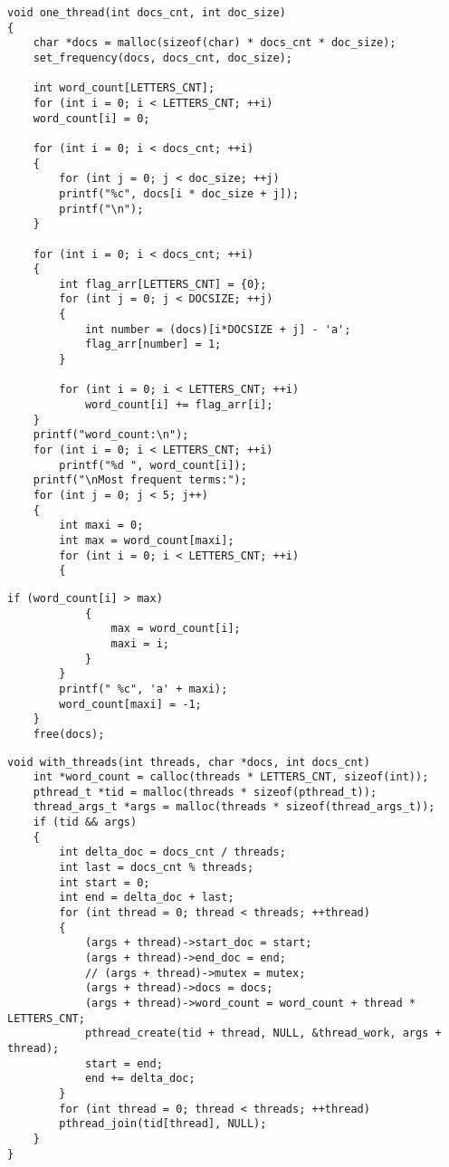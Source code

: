 \clearpage
\begin{center}
	\captionsetup{justification=raggedright,singlelinecheck=off}
	\begin{lstlisting}[label=lst:DF,caption=Однопоточная функция выделения наиболее употребляемых термов]
void one_thread(int docs_cnt, int doc_size)
{
	char *docs = malloc(sizeof(char) * docs_cnt * doc_size);
	set_frequency(docs, docs_cnt, doc_size);
	
	int word_count[LETTERS_CNT];
	for (int i = 0; i < LETTERS_CNT; ++i)
	word_count[i] = 0;
	
	for (int i = 0; i < docs_cnt; ++i)
	{
		for (int j = 0; j < doc_size; ++j)
		printf("%c", docs[i * doc_size + j]);
		printf("\n");
	}
	
	for (int i = 0; i < docs_cnt; ++i)
	{
		int flag_arr[LETTERS_CNT] = {0};
		for (int j = 0; j < DOCSIZE; ++j)
		{
			int number = (docs)[i*DOCSIZE + j] - 'a';
			flag_arr[number] = 1;
		}
			
		for (int i = 0; i < LETTERS_CNT; ++i)
			word_count[i] += flag_arr[i];
	}
	printf("word_count:\n");
	for (int i = 0; i < LETTERS_CNT; ++i)
		printf("%d ", word_count[i]);
	printf("\nMost frequent terms:");
	for (int j = 0; j < 5; j++)
	{
		int maxi = 0;
		int max = word_count[maxi];
		for (int i = 0; i < LETTERS_CNT; ++i)
		{
	\end{lstlisting}
\clearpage
	\begin{lstlisting}[label=lst:DF2,caption=Однопоточная функция выделения наиболее употребляемых термов]
			if (word_count[i] > max)
			{
				max = word_count[i];
				maxi = i;
			}
		}
		printf(" %c", 'a' + maxi);
		word_count[maxi] = -1;
	}
	free(docs);
	\end{lstlisting}

	\begin{lstlisting}[label=lst:main,caption=Функция работы основного потока\, запускающего вспомогательные потоки]
void with_threads(int threads, char *docs, int docs_cnt)
	int *word_count = calloc(threads * LETTERS_CNT, sizeof(int));
	pthread_t *tid = malloc(threads * sizeof(pthread_t));
	thread_args_t *args = malloc(threads * sizeof(thread_args_t));
	if (tid && args)
	{
		int delta_doc = docs_cnt / threads;
		int last = docs_cnt % threads;
		int start = 0;
		int end = delta_doc + last;
		for (int thread = 0; thread < threads; ++thread)
		{
			(args + thread)->start_doc = start;
			(args + thread)->end_doc = end;
			// (args + thread)->mutex = mutex;
			(args + thread)->docs = docs;
			(args + thread)->word_count = word_count + thread * LETTERS_CNT;
			pthread_create(tid + thread, NULL, &thread_work, args + thread);
			start = end;
			end += delta_doc;
		}
		for (int thread = 0; thread < threads; ++thread)
		pthread_join(tid[thread], NULL);
	}
}
	\end{lstlisting}


\end{center}
